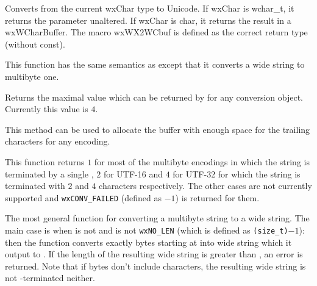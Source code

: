 
Converts from the current wxChar type to Unicode. If wxChar is wchar\_t,
it returns the parameter unaltered. If wxChar is char, it returns the
result in a wxWCharBuffer. The macro wxWX2WCbuf is defined as the correct
return type (without const).


\label{wxmbconvfromwchar}


This function has the same semantics as  
except that it converts a wide string to multibyte one.

\label{wxmbconvgetmaxmbnullen}


Returns the maximal value which can be returned by 
 for any conversion object. Currently
this value is $4$.

This method can be used to allocate the buffer with enough space for the
trailing \NUL characters for any encoding.


\label{wxmbconvgetmbnullen}


This function returns $1$ for most of the multibyte encodings in which the
string is terminated by a single \NUL, $2$ for UTF-16 and $4$ for UTF-32 for
which the string is terminated with $2$ and $4$ \NUL characters respectively.
The other cases are not currently supported and \texttt{wxCONV\_FAILED} 
(defined as $-1$) is returned for them.


\label{wxmbconvtowchar}


The most general function for converting a multibyte string to a wide string.
The main case is when  is not \NULL and  is not 
\texttt{wxNO\_LEN} (which is defined as \texttt{(size\_t)$-1$}): then
the function converts exactly  bytes starting at  into
wide string which it output to . If the length of the resulting wide
string is greater than , an error is returned. Note that if 
 bytes don't include \NUL characters, the resulting wide string is
not \NUL-terminated neither.

